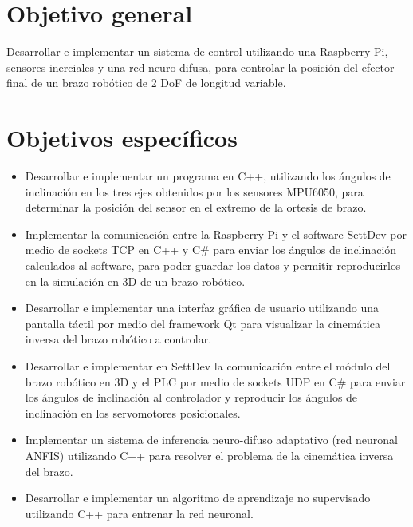 \section{Objetivo general}

Desarrollar e implementar un sistema de control utilizando una Raspberry Pi, sensores inerciales y una red neuro-difusa, para controlar la posición del efector final de un brazo robótico de 2 DoF de longitud variable.

\newpage
\section{Objetivos específicos}
\begin{itemize}
	
	\item Desarrollar e implementar un programa en C++, utilizando los ángulos de inclinación en los tres ejes obtenidos por los sensores MPU6050, para determinar la posición del sensor en el extremo de la ortesis de brazo.
	
	\item Implementar la comunicación entre la Raspberry Pi y el software SettDev por medio de sockets TCP en C++ y C\# para enviar los ángulos de inclinación calculados al software, para poder guardar los datos y permitir reproducirlos en la simulación en 3D de un brazo robótico.
	
	\item Desarrollar e implementar una interfaz gráfica de usuario utilizando una pantalla táctil por medio del framework Qt para visualizar la cinemática inversa del brazo robótico a controlar.
	
	\item Desarrollar e implementar en SettDev la comunicación entre el módulo del brazo robótico en 3D y el PLC por medio de sockets UDP en C\# para enviar los ángulos de inclinación al controlador y reproducir los ángulos de inclinación en los servomotores posicionales.
	
	\item Implementar un sistema de inferencia neuro-difuso adaptativo (red neuronal ANFIS) utilizando C++ para resolver el problema de la cinemática inversa del brazo.
	
	\item Desarrollar e implementar un algoritmo de aprendizaje no supervisado utilizando C++ para entrenar la red neuronal.
	
\end{itemize}